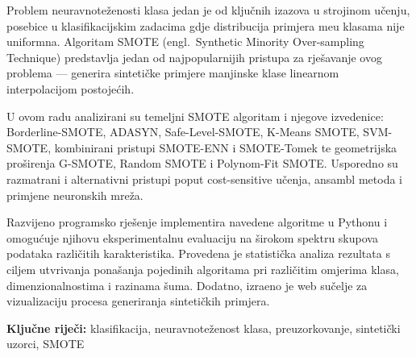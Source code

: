 
Problem neuravnote\v{z}enosti klasa jedan je od klju\v{c}nih izazova u
strojinom u\v{c}enju, posebice u klasifikacijskim zadacima gdje
distribucija primjera me\dj{}u klasama nije uniformna. Algoritam SMOTE
(engl.\ Synthetic Minority Over-sampling Technique) predstavlja jedan od
najpopularnijih pristupa za rje\v{s}avanje ovog problema — generira
sinteti\v{c}ke primjere manjinske klase linearnom interpolacijom
postoje\'{c}ih.

U ovom radu analizirani su temeljni SMOTE algoritam i njegove izvedenice:
Borderline-SMOTE, ADASYN, Safe-Level-SMOTE, K-Means SMOTE, SVM-SMOTE,
kombinirani pristupi SMOTE-ENN i SMOTE-Tomek te geometrijska
pro\v{s}irenja G-SMOTE, Random SMOTE i Polynom-Fit SMOTE. Usporedno su
razmatrani i alternativni pristupi poput cost-sensitive u\v{c}enja,
ansambl metoda i primjene neuronskih mre\v{z}a.

Razvijeno programsko rje\v{s}enje implementira navedene algoritme u
Pythonu i omogu\'{c}uje njihovu eksperimentalnu evaluaciju na \v{s}irokom
spektru skupova podataka razli\v{c}itih karakteristika. Provedena je
statisti\v{c}ka analiza rezultata s ciljem utvr\dj{}ivanja pona\v{s}anja
pojedinih algoritama pri razli\v{c}itim omjerima klasa,
dimenzionalnostima i razinama \v{s}uma. Dodatno, izra\dj{}eno je web
su\v{c}elje za vizualizaciju procesa generiranja sinteti\v{c}kih
primjera.

\bigskip
\noindent\textbf{Klju\v{c}ne rije\v{c}i:} klasifikacija, neuravnote\v{z}enost klasa,
preuzorkovanje, sinteti\v{c}ki uzorci, SMOTE
